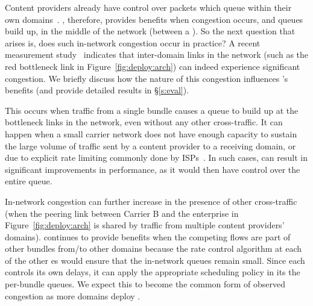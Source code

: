 
Content providers already have control over packets which queue within their own domains~\cite{swan, b4, bwe}. \name, therefore, provides benefits when congestion occurs, and queues build up, in the middle of the network (\ie between a \pair).  
So the next question that arises is, does such in-network congestion occur in practice? A recent measurement study~\cite{inferring-interdomain-congestion} indicates that inter-domain links in the network (such as the red bottleneck link in Figure~\ref{fig:deploy:arch}) can indeed experience significant congestion. 
We briefly discuss how the nature of this congestion influences \name's benefits (and provide detailed results in \S\ref{s:eval}).

 This occurs when traffic from a single bundle causes a queue to build up at the bottleneck links in the network, even without any other cross-traffic. It can happen when a small carrier network does not have enough capacity to sustain the large volume of traffic sent by a content provider to a receiving domain, or due to explicit rate limiting commonly done by ISPs~\cite{isp-throttle-1, isp-throttle-2, isp-throttle-3}. In such cases, \name can result in
significant improvements in performance, as it would then have control over the entire queue. 

 In-network congestion can further increase in the presence of other cross-traffic (\eg when the peering link between Carrier B and the enterprise in Figure~\ref{fig:deploy:arch} is shared by traffic from multiple content providers' domains). 
\name continues to provide benefits when the competing flows are part of other bundles from/to other domains because the rate control algorithm at each of the other {\inbox}es would ensure that the in-network queues remain small. Since each \inbox controls its own delays, it can apply the appropriate scheduling policy in its the per-bundle queues.
We expect this to become the common form of observed congestion as more domains deploy \name. 

